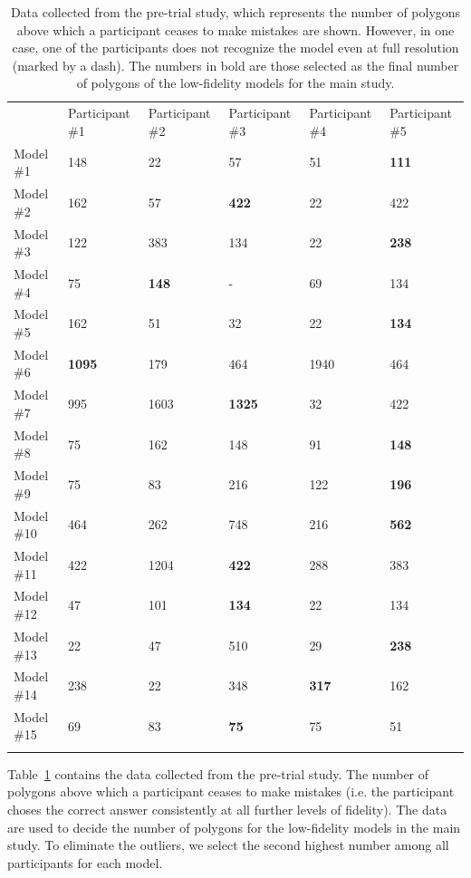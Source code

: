 \begin{table}[!htbp]
\caption{Data collected from the pre-trial study, which represents the number of polygons above which a participant ceases to make mistakes are shown. However, in one case, one of the participants does not recognize the model even at full resolution (marked by a dash). The numbers in bold are those selected as the final number of polygons of the low-fidelity models for the main study.}
\label{tab:pts}
\begin{tabular}{llllll}
\hline\noalign{\smallskip}
& Participant \#1 & Participant \#2 & Participant \#3 & Participant \#4 & Participant \#5 \\
\noalign{\smallskip}\hline\noalign{\smallskip}
Model \#1 & 148 & 22 & 57 & 51 & \textbf{111} \\
Model \#2 & 162 & 57 & \textbf{422} & 22 & 422 \\
Model \#3 & 122 & 383 & 134 & 22 & \textbf{238} \\
Model \#4 & 75 & \textbf{148} & - & 69 & 134 \\
Model \#5 & 162 & 51 & 32 & 22 & \textbf{134} \\
Model \#6 & \textbf{1095} & 179 & 464 & 1940 & 464 \\
Model \#7 & 995 & 1603 & \textbf{1325} & 32 & 422 \\
Model \#8 & 75 & 162 & 148 & 91 & \textbf{148} \\
Model \#9 & 75 & 83 & 216 & 122 & \textbf{196} \\
Model \#10 & 464 & 262 & 748 & 216 & \textbf{562} \\
Model \#11 & 422 & 1204 & \textbf{422} & 288 & 383 \\
Model \#12 & 47 & 101 & \textbf{134} & 22 & 134 \\
Model \#13 & 22 & 47 & 510 & 29 & \textbf{238} \\
Model \#14 & 238 & 22 & 348 & \textbf{317} & 162 \\
Model \#15 & 69 & 83 & \textbf{75} & 75 & 51 \\
\noalign{\smallskip}\hline
\end{tabular}
\end{table}

Table~\ref{tab:pts} contains the data collected from the pre-trial study. The number of polygons above which a participant ceases to make mistakes (i.e. the participant choses the correct answer consistently at all further levels of fidelity). The data are used to decide the number of polygons for the low-fidelity models in the main study. To eliminate the outliers, we select the second highest number among all participants for each model.

